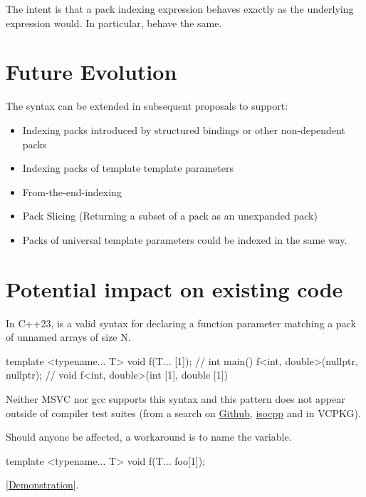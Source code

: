 \documentclass{wg21}
\begin{document}
The intent is that a pack indexing expression behaves exactly as the underlying expression would.
In particular,  behave the same.

\section{Future Evolution}

The syntax can be extended  in subsequent proposals to support:

\begin{itemize}
\item Indexing packs introduced by structured bindings or other non-dependent packs
\item Indexing packs of template template parameters
\item From-the-end-indexing
\item Pack Slicing (Returning a subset of a pack as an unexpanded pack)
\item Packs of universal template parameters could be indexed in the same way.
\end{itemize}


\section{Potential impact on existing code}

In C++23,  is a valid syntax for declaring a function parameter matching a pack of unnamed arrays of size N.

\begin{colorblock}
template <typename... T>
void f(T... [1]); //
int main() {
    f<int, double>(nullptr, nullptr); // void f<int, double>(int [1], double [1])
}
\end{colorblock}

Neither MSVC nor gcc supports this syntax and this pattern does not appear outside of compiler test suites (from a search on \href{https://cs.github.com/}{Github}, \href{https://codesearch.isocpp.org/cgi-bin/cgi_ppsearch?q=...%5B&search=Search}{isocpp} and in VCPKG).

Should anyone be affected, a workaround is to name the variable.

\begin{colorblock}
template <typename... T>
void f(T... foo[1]);
\end{colorblock}

[\href{https://godbolt.org/z/T7v3ETz1G}{Demonstration}].
\end{document}
